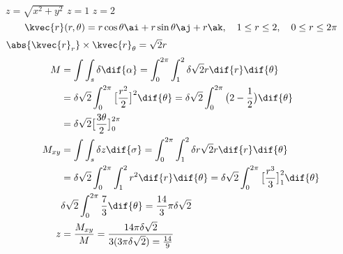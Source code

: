 \(  z=\sqrt{x^{2}+y^{2}}\)
\(  z=1\) 
\(   z=2  \)
\[  \kvec{r}(r,\theta)=r\cos\theta\ai+r\sin\theta\aj+r\ak,\quad 1\le r\le 2, \quad 0\le r\le 2\pi\]
\( \abs{\kvec{r}_{r}}\times\kvec{r}_{\theta} =\sqrt{2}r \)
\begin{align}
M&=\int\int_{s}\delta\dif{\alpha}=\int_{0}^{2\pi}\int_{1}^{2}\delta\sqrt{2}r\dif{r}\dif{\theta} \\
&=\delta\sqrt{2}\int_{0}^{2\pi}\big[ \frac{r^{2}}{2}  \big]^{2}\dif{\theta}=\delta\sqrt{2}\int_{0}^{2\pi}\big( 2-\frac{1}{2}  \big) \dif{\theta} \\
& =\delta\sqrt{2}\big[ \frac{3\theta}{2}\big]_{0}^{2\pi} \\
M_{xy}&=\int\int_{s}\delta z \dif{\sigma}=\int_{0}^{2\pi}\int_{1}^{2}\delta r \sqrt{2}r\dif{r}\dif{\theta}  \\
& =\delta\sqrt{2}\int_{0}^{2\pi}\int_{1}^{2}r^{2}\dif{r}\dif{\theta}=\delta\sqrt{2}\int_{0}^{2\pi}\big[ \frac{r^{3}}{3}\big]_{1}^{2}\dif{\theta}  \\
&\delta\sqrt{2}\int_{0}^{2\pi}\frac{7}{3}\dif{\theta}=\frac{14}{3}\pi\delta\sqrt{2}   \\
z&=\frac{M_{xy}}{M}=\frac{14\pi\delta\sqrt{2}}{3(3\pi\delta\sqrt{2})=\frac{14}{9}}
\end{align}



